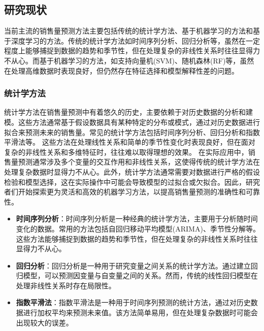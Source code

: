 \documentclass[12pt]{article}
\begin{document}
\subsection{研究现状}
当前主流的销售量预测方法主要包括传统的统计学方法、基于机器学习的方法和基于深度学习的方法。传统的统计学方法如时间序列分析、回归分析等，虽然在一定程度上能够捕捉到数据的趋势和季节性，但在处理复杂的非线性关系时往往显得力不从心。而基于机器学习的方法，如支持向量机(SVM)、随机森林(RF)等，虽然在处理高维数据时表现良好，但仍然存在特征选择和模型解释性差的问题。
\subsubsection{统计学方法}
统计学方法在销售量预测中有着悠久的历史，主要依赖于对历史数据的分析和建模。这些方法通常基于假设数据具有某种特定的分布或模式，通过对历史数据进行拟合来预测未来的销售量。常见的统计学方法包括时间序列分析、回归分析和指数平滑法等。
这些方法在处理线性关系和简单的季节性变化时表现良好，但在面对复杂的非线性关系和多维特征时，往往难以取得理想的效果。
在实际应用中，销售量预测通常涉及多个变量的交互作用和非线性关系，这使得传统的统计学方法在处理复杂数据时显得力不从心。此外，统计学方法通常需要对数据进行严格的假设检验和模型选择，这在实际操作中可能会导致模型的过拟合或欠拟合。因此，研究者们开始探索更为灵活和高效的机器学习方法，以提高销售量预测的准确性和可靠性。
\begin{itemize}
    \item \textbf{时间序列分析}：时间序列分析是一种经典的统计学方法，主要用于分析随时间变化的数据。常用的方法包括自回归移动平均模型(ARIMA)\cite{ARIMA}、季节性分解等。这些方法能够捕捉到数据的趋势和季节性，但在处理复杂的非线性关系时往往显得力不从心。
    \item \textbf{回归分析}：回归分析是一种用于研究变量之间关系的统计学方法。通过建立回归模型，可以预测因变量与自变量之间的关系\cite{TimeSeriesAnalysis}。然而，传统的线性回归模型在处理非线性关系时存在局限性。
    \item \textbf{指数平滑法}：指数平滑法是一种用于时间序列预测的统计方法，通过对历史数据进行加权平均来预测未来值。该方法简单易用，但在处理复杂数据时可能会出现较大的误差。
\end{itemize}
\end{document}
